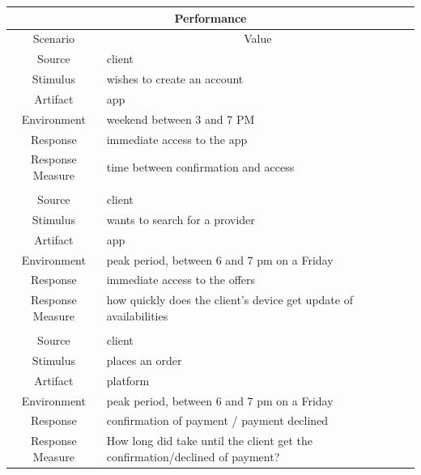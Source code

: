 \begin{table}[H]
    \begin{tabularx}{\textwidth}{|c|X|}
        \hline
        \multicolumn{2}{c}{\textbf{Performance}} \\
        \hline
        \toprule
        \multicolumn{1}{c}{Scenario} & \multicolumn{1}{c}{Value} \\
        \midrule
        Source & \gls{client}  \\
        Stimulus & wishes to create an account \\
        Artifact & app \\
        Environment & weekend between 3 and 7 PM \\
        Response & immediate access to the app \\
        Response Measure & time between confirmation and access \\
         & \\
        Source & \gls{client}  \\
        Stimulus & wants to search for a \gls{provider} \\
        Artifact & app \\
        Environment & peak period, between 6 and 7 pm on a Friday \\
        Response & immediate access to the offers \\
        Response Measure & how quickly does the client's device get update of availabilities \\
        & \\
        Source & \gls{client}  \\
        Stimulus & places an order \\
        Artifact & platform \\
        Environment & peak period, between 6 and 7 pm on a Friday \\
        Response & confirmation of payment / payment declined \\
        Response Measure & How long did take until the client get the confirmation/declined of payment?\\
        \bottomrule
    \end{tabularx}
\end{table}



